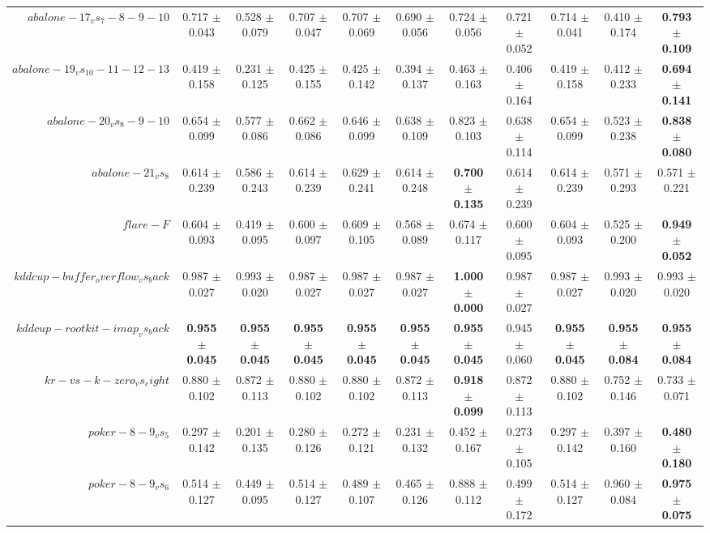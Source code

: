 \begin{table}[!ht]
{\begin{tabular}{r c c c c c c c c c c}
$abalone-17_vs_7-8-9-10$ & 0.717 $\pm$ 0.043 & 0.528 $\pm$ 0.079 & 0.707 $\pm$ 0.047 & 0.707 $\pm$ 0.069 & 0.690 $\pm$ 0.056 & 0.724 $\pm$ 0.056 & 0.721 $\pm$ 0.052 & 0.714 $\pm$ 0.041 & 0.410 $\pm$ 0.174 & \textbf{0.793 $\pm$ 0.109} \\
$abalone-19_vs_10-11-12-13$ & 0.419 $\pm$ 0.158 & 0.231 $\pm$ 0.125 & 0.425 $\pm$ 0.155 & 0.425 $\pm$ 0.142 & 0.394 $\pm$ 0.137 & 0.463 $\pm$ 0.163 & 0.406 $\pm$ 0.164 & 0.419 $\pm$ 0.158 & 0.412 $\pm$ 0.233 & \textbf{0.694 $\pm$ 0.141} \\
$abalone-20_vs_8-9-10$ & 0.654 $\pm$ 0.099 & 0.577 $\pm$ 0.086 & 0.662 $\pm$ 0.086 & 0.646 $\pm$ 0.099 & 0.638 $\pm$ 0.109 & 0.823 $\pm$ 0.103 & 0.638 $\pm$ 0.114 & 0.654 $\pm$ 0.099 & 0.523 $\pm$ 0.238 & \textbf{0.838 $\pm$ 0.080} \\
$abalone-21_vs_8$ & 0.614 $\pm$ 0.239 & 0.586 $\pm$ 0.243 & 0.614 $\pm$ 0.239 & 0.629 $\pm$ 0.241 & 0.614 $\pm$ 0.248 & \textbf{0.700 $\pm$ 0.135} & 0.614 $\pm$ 0.239 & 0.614 $\pm$ 0.239 & 0.571 $\pm$ 0.293 & 0.571 $\pm$ 0.221 \\
$flare-F$ & 0.604 $\pm$ 0.093 & 0.419 $\pm$ 0.095 & 0.600 $\pm$ 0.097 & 0.609 $\pm$ 0.105 & 0.568 $\pm$ 0.089 & 0.674 $\pm$ 0.117 & 0.600 $\pm$ 0.095 & 0.604 $\pm$ 0.093 & 0.525 $\pm$ 0.200 & \textbf{0.949 $\pm$ 0.052} \\
$kddcup-buffer_overflow_vs_back$ & 0.987 $\pm$ 0.027 & 0.993 $\pm$ 0.020 & 0.987 $\pm$ 0.027 & 0.987 $\pm$ 0.027 & 0.987 $\pm$ 0.027 & \textbf{1.000 $\pm$ 0.000} & 0.987 $\pm$ 0.027 & 0.987 $\pm$ 0.027 & 0.993 $\pm$ 0.020 & 0.993 $\pm$ 0.020 \\
$kddcup-rootkit-imap_vs_back$ & \textbf{0.955 $\pm$ 0.045} & \textbf{0.955 $\pm$ 0.045} & \textbf{0.955 $\pm$ 0.045} & \textbf{0.955 $\pm$ 0.045} & \textbf{0.955 $\pm$ 0.045} & \textbf{0.955 $\pm$ 0.045} & 0.945 $\pm$ 0.060 & \textbf{0.955 $\pm$ 0.045} & \textbf{0.955 $\pm$ 0.084} & \textbf{0.955 $\pm$ 0.084} \\
$kr-vs-k-zero_vs_eight$ & 0.880 $\pm$ 0.102 & 0.872 $\pm$ 0.113 & 0.880 $\pm$ 0.102 & 0.880 $\pm$ 0.102 & 0.872 $\pm$ 0.113 & \textbf{0.918 $\pm$ 0.099} & 0.872 $\pm$ 0.113 & 0.880 $\pm$ 0.102 & 0.752 $\pm$ 0.146 & 0.733 $\pm$ 0.071 \\
$poker-8-9_vs_5$ & 0.297 $\pm$ 0.142 & 0.201 $\pm$ 0.135 & 0.280 $\pm$ 0.126 & 0.272 $\pm$ 0.121 & 0.231 $\pm$ 0.132 & 0.452 $\pm$ 0.167 & 0.273 $\pm$ 0.105 & 0.297 $\pm$ 0.142 & 0.397 $\pm$ 0.160 & \textbf{0.480 $\pm$ 0.180} \\
$poker-8-9_vs_6$ & 0.514 $\pm$ 0.127 & 0.449 $\pm$ 0.095 & 0.514 $\pm$ 0.127 & 0.489 $\pm$ 0.107 & 0.465 $\pm$ 0.126 & 0.888 $\pm$ 0.112 & 0.499 $\pm$ 0.172 & 0.514 $\pm$ 0.127 & 0.960 $\pm$ 0.084 & \textbf{0.975 $\pm$ 0.075} \\

\end{tabular}}
\end{table}
